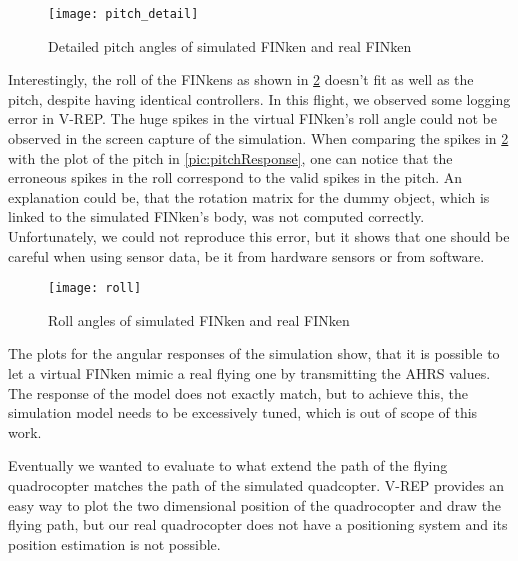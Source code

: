 \begin{figure}
	\begin{center}
	\texttt{[image: pitch\_detail]}
	\caption{Detailed pitch angles of simulated FINken and real FINken}
	\label{pic:pitchDetail}
	\end{center}
\end{figure}

Interestingly, the roll of the FINkens as shown in \ref{pic:rollResponse} doesn't fit as well as the pitch, despite having identical controllers.
In this flight, we observed some logging error in V-REP. 
The huge spikes in the virtual FINken's roll angle could not be observed in the screen capture of the simulation.
When comparing the spikes in \ref{pic:rollResponse} with the plot of the pitch in \ref{pic:pitchResponse}, one can notice that the erroneous spikes in the roll correspond to the valid spikes in the pitch.
An explanation could be, that the rotation matrix for the dummy object, which is linked to the simulated FINken's body, was not computed correctly.
Unfortunately, we could not reproduce this error, but it shows that one should be careful when using sensor data, be it from hardware sensors or from software.

\begin{figure}
	\begin{center}
	\texttt{[image: roll]}
	\caption{Roll angles of simulated FINken and real FINken}
	\label{pic:rollResponse}
	\end{center}
\end{figure}

The plots for the angular responses of the simulation show, that it is possible to let a virtual FINken mimic a real flying one by transmitting the \gls{AHRS} values. 
The response of the model does not exactly match, but to achieve this, the simulation model needs to be excessively tuned, which is out of scope of this work.



Eventually we wanted to evaluate to what extend the path of the flying quadrocopter matches the path of the simulated quadcopter. V-REP provides an easy way to plot the two dimensional position of the quadrocopter and draw the flying path, but our real quadrocopter does not have a positioning system and its position estimation is not possible.\\ 


